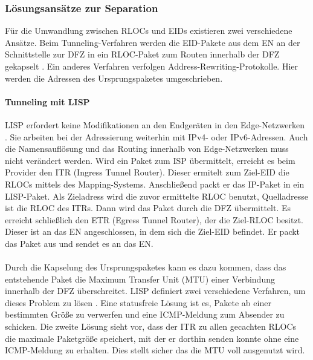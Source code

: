 \subsubsection{Lösungsansätze zur Separation}
Für die Umwandlung zwischen RLOCs und EIDs existieren zwei verschiedene Ansätze. Beim Tunneling-Verfahren werden die EID-Pakete aus dem EN an der Schnittstelle zur DFZ in ein RLOC-Paket zum Routen innerhalb der DFZ gekapselt \cite{farinacci:2009:LISP}. Ein anderes Verfahren verfolgen Address-Rewriting-Protokolle. Hier werden die Adressen des Ursprungspaketes umgeschrieben. 

\paragraph{Tunneling mit LISP}
LISP erfordert keine Modifikationen an den Endgeräten in den Edge-Netzwerken \cite{farinacci:2009:LISP}. Sie arbeiten bei der Adressierung weiterhin mit IPv4- oder IPv6-Adressen. Auch die Namensauflösung und das Routing innerhalb von Edge-Netzwerken muss nicht verändert werden. Wird ein Paket zum ISP übermittelt, erreicht es beim Provider den ITR (Ingress Tunnel Router). Dieser ermitelt zum Ziel-EID die RLOCs mittels des Mapping-Systems. Anschließend packt er das IP-Paket in ein LISP-Paket. Als Zieladress wird die zuvor ermittelte RLOC benutzt, Quelladresse ist die RLOC des ITRs. Dann wird das Paket durch die DFZ übermittelt. Es erreicht schließlich den ETR (Egress Tunnel Router), der die Ziel-RLOC besitzt. Dieser ist an das EN angeschlossen, in dem sich die Ziel-EID befindet. Er packt das Paket aus und sendet es an das EN.
\paragraph{}
Durch die Kapselung des Ursprungspaketes kann es dazu kommen, dass das entstehende Paket die Maximum Transfer Unit (MTU) einer Verbindung innerhalb der DFZ überschreitet. LISP definiert zwei verschiedene Verfahren, um dieses Problem zu lösen \cite{farinacci:2009:LISP}. Eine statusfreie Lösung ist es, Pakete ab einer bestimmten Größe zu verwerfen und eine ICMP-Meldung zum Absender zu schicken. Die zweite Lösung sieht vor, dass der ITR zu allen gecachten RLOCs die maximale Paketgröße speichert, mit der er dorthin senden konnte ohne eine ICMP-Meldung zu erhalten. Dies stellt sicher das die MTU voll ausgenutzt wird.

